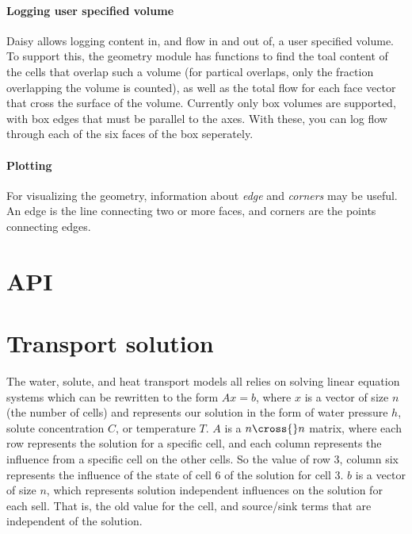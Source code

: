 \documentclass[a4paper,11pt,twoside]{article}
\begin{document}
\paragraph{Logging user specified volume}
Daisy allows logging content in, and flow in and out of, a user
specified volume.  To support this, the geometry module has functions
to find the toal content of the cells that overlap such a volume (for
partical overlaps, only the fraction overlapping the volume is
counted), as well as the total flow for each face vector that cross
the surface of the volume.  Currently only box volumes are supported,
with box edges that must be parallel to the axes.  With these, you can
log flow through each of the six faces of the box seperately.

\paragraph{Plotting}

For visualizing the geometry, information about \emph{edge} and
\emph{corners} may be useful.  An edge is the line connecting two or
more faces, and corners are the points connecting edges.

\section{API}

\section{Transport solution}

The water, solute, and heat transport models all relies on solving
linear equation systems which can be rewritten to the form $A x = b$,
where $x$ is a vector of size $n$ (the number of cells) and represents
our solution in the form of water pressure $h$, solute concentration
$C$, or temperature $T$.  $A$ is a $n\cross{}n$ matrix, where each row
represents the solution for a specific cell, and each column
represents the influence from a specific cell on the other cells.  So
the value of row 3, column six represents the influence of the state
of cell 6 of the solution for cell 3.  $b$ is a vector of size $n$,
which represents solution independent influences on the solution for
each sell.  That is, the old value for the cell, and source/sink terms
that are independent of the solution.
\end{document}
